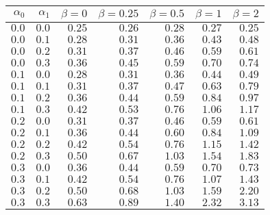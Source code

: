 \begin{tabular}{rr|rrrrr}
\hline\hline
 $\alpha_0$ & $\alpha_1$ & $\beta=0$ & $\beta=0.25$ & $\beta=0.5$ & $\beta=1$ & $\beta=2$ \\ 
 \hline
$0.0$ & $0.0$ & $0.25$ & $0.26$ & $0.28$ & $0.27$ & $0.25$\\ 
$0.0$ & $0.1$ & $0.28$ & $0.31$ & $0.36$ & $0.43$ & $0.48$\\ 
$0.0$ & $0.2$ & $0.31$ & $0.37$ & $0.46$ & $0.59$ & $0.61$\\ 
$0.0$ & $0.3$ & $0.36$ & $0.45$ & $0.59$ & $0.70$ & $0.74$\\ 
$0.1$ & $0.0$ & $0.28$ & $0.31$ & $0.36$ & $0.44$ & $0.49$\\ 
$0.1$ & $0.1$ & $0.31$ & $0.37$ & $0.47$ & $0.63$ & $0.79$\\ 
$0.1$ & $0.2$ & $0.36$ & $0.44$ & $0.59$ & $0.84$ & $0.97$\\ 
$0.1$ & $0.3$ & $0.42$ & $0.53$ & $0.76$ & $1.06$ & $1.17$\\ 
$0.2$ & $0.0$ & $0.31$ & $0.37$ & $0.46$ & $0.59$ & $0.61$\\ 
$0.2$ & $0.1$ & $0.36$ & $0.44$ & $0.60$ & $0.84$ & $1.09$\\ 
$0.2$ & $0.2$ & $0.42$ & $0.54$ & $0.76$ & $1.15$ & $1.42$\\ 
$0.2$ & $0.3$ & $0.50$ & $0.67$ & $1.03$ & $1.54$ & $1.83$\\ 
$0.3$ & $0.0$ & $0.36$ & $0.44$ & $0.59$ & $0.70$ & $0.73$\\ 
$0.3$ & $0.1$ & $0.42$ & $0.54$ & $0.76$ & $1.07$ & $1.43$\\ 
$0.3$ & $0.2$ & $0.50$ & $0.68$ & $1.03$ & $1.59$ & $2.20$\\ 
$0.3$ & $0.3$ & $0.63$ & $0.89$ & $1.40$ & $2.32$ & $3.13$\\ 
 \hline 
 \end{tabular}